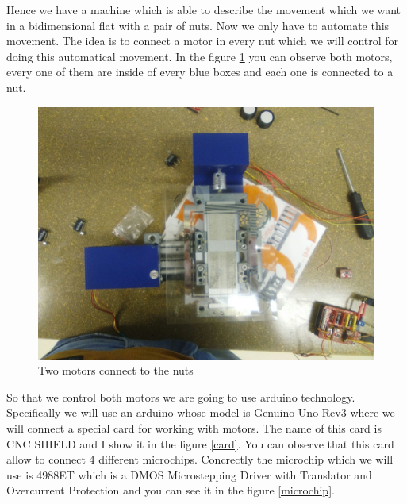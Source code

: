 \begin{itemize}
Hence we have a machine which is able to describe the movement which we want in a bidimensional flat with a pair of nuts. Now we only have to automate this movement. The idea is to connect a motor in every nut which we will control for doing this automatical movement. In the figure \ref{motors} you can observe both motors, every one of them are inside of every blue boxes and each one is connected to a nut. 

\begin{figure}[hbtp]
\centering
\includegraphics[scale=0.15]{../Figures/motors.jpeg}
\caption{Two motors connect to the nuts\label{motors}}
\end{figure}

So that we control both motors we are going to use arduino technology. Specifically we will use an arduino whose model is Genuino Uno Rev3 where we will connect a special card for working with motors. The name of this card is CNC SHIELD and I show it in the figure \ref{card}. You can observe that this card allow to connect 4 different microchips. Concrectly the microchip which we will use is 4988ET which is a DMOS Microstepping Driver with Translator and Overcurrent Protection and you can see it in the figure \ref{microchip}.


\end{itemize}
